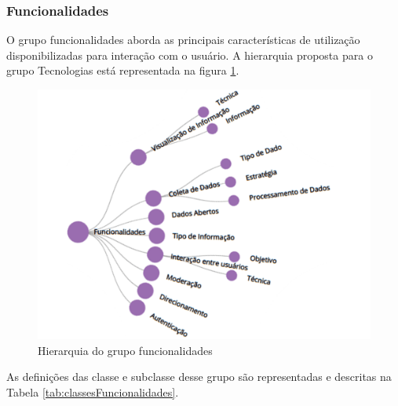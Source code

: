 \newpage
\subsubsection{Funcionalidades}
\label{subsubsec:funcionalidades}
O grupo funcionalidades aborda as principais características de utilização disponibilizadas para interação com o usuário.
A hierarquia proposta para o grupo Tecnologias está representada na figura \ref{fig:grupo-funcionalidades}.

\begin{figure}[!ht]
    \centering
    \includegraphics[scale=0.30]{./figuras/funcionalidades.png}
    \caption{Hierarquia do grupo funcionalidades}
    \label{fig:grupo-funcionalidades}
\end{figure}

\par
As definições das classe e subclasse desse grupo são representadas e descritas na Tabela \ref{tab:classesFuncionalidades}.

